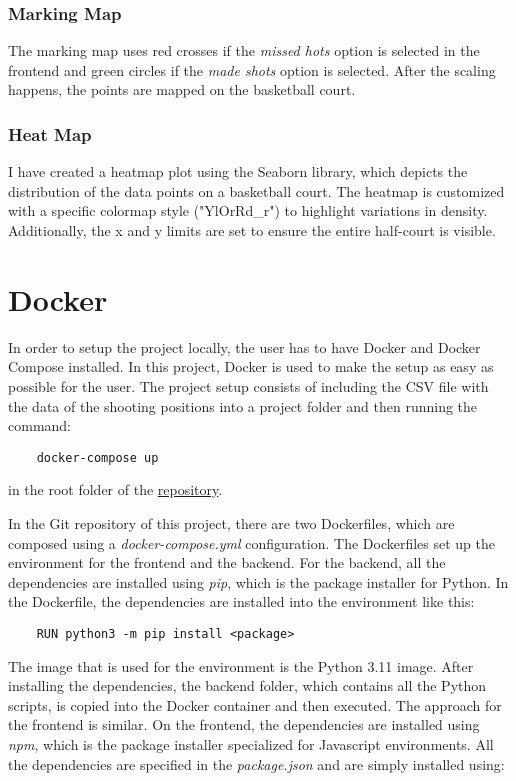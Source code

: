 \documentclass[sn-mathphys-num]{sn-jnl}%
\theoremstyle{thmstyleone}%
\theoremstyle{thmstyletwo}%
\theoremstyle{thmstylethree}%
\begin{document}
\subsubsection{Marking Map}\label{subsubsec1}
The marking map uses red crosses if the \textit{missed hots} option is selected in the frontend and green circles if the \textit{made shots} option is selected. After the scaling happens, the points are mapped on the basketball court.

\subsubsection{Heat Map}\label{subsubsec2}
I have created a heatmap plot using the Seaborn library, which depicts the distribution of the data points on a basketball court. The heatmap is customized with a specific colormap style ("YlOrRd\_r") to highlight variations in density. Additionally, the x and y limits are set to ensure the entire half-court is visible.

\section{Docker}\label{sec5}
In order to setup the project locally, the user has to have Docker and Docker Compose installed. In this project, Docker is used to make the setup as easy as possible for the user.
The project setup consists of including the CSV file with the data of the shooting positions into a project folder and then running the command:
\bigskip
\begin{verbatim}
    docker-compose up
\end{verbatim}
\bigskip
in the root folder of the \href{https://github.com/freiburg-missing-semester-course/project-Emredinho61}{repository}.

In the Git repository of this project, there are two Dockerfiles, which are composed using a \textit{docker-compose.yml} configuration. The Dockerfiles set up the environment for the frontend and the backend. For the backend, all the dependencies are installed using \textit{pip}, which is the package installer for Python. In the Dockerfile, the dependencies are installed into the environment like this:

\bigskip
\begin{verbatim}
    RUN python3 -m pip install <package>
\end{verbatim}
\bigskip

The image that is used for the environment is the Python 3.11 image. After installing the dependencies, the backend folder, which contains all the Python scripts, is copied into the Docker container and then executed.
The approach for the frontend is similar. On the frontend, the dependencies are installed using \textit{npm}, which is the package installer specialized for Javascript environments. All the dependencies are specified in the \textit{package.json} and are simply installed using:
\end{document}
